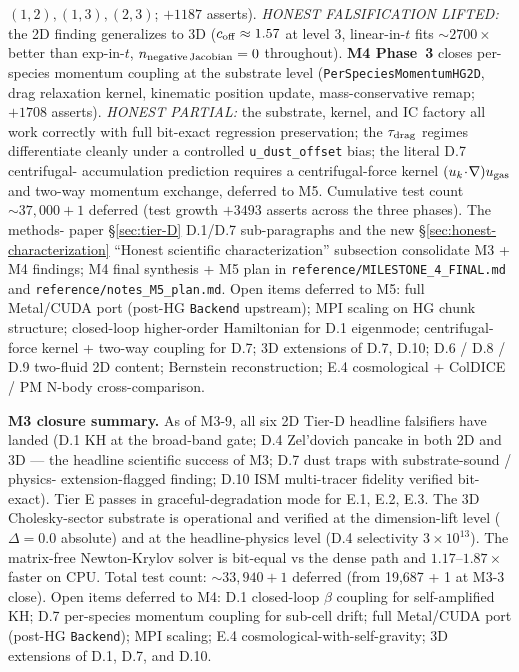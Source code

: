 \documentclass[11pt]{article}
\begin{document}
\begin{description}
$(1,2), (1,3), (2,3)$; $+1187$ asserts). \emph{HONEST FALSIFICATION
LIFTED:} the 2D finding generalizes to 3D ($c_{\rm off} \approx 1.57$
at level $3$, linear-in-$t$ fits $\sim 2700\times$ better than
exp-in-$t$, $n_{\rm negative\,Jacobian} = 0$ throughout). \textbf{M4
Phase~3} closes per-species momentum coupling at the substrate level
(\texttt{PerSpeciesMomentumHG2D}, drag relaxation kernel, kinematic
position update, mass-conservative remap; $+1708$ asserts).
\emph{HONEST PARTIAL:} the substrate, kernel, and IC factory all
work correctly with full bit-exact regression preservation; the
$\tau_{\rm drag}$ regimes differentiate cleanly under a controlled
\texttt{u\_dust\_offset} bias; the literal D.7 centrifugal-
accumulation prediction requires a centrifugal-force kernel
$(u_k\!\cdot\!\nabla)u_{\rm gas}$ and two-way momentum exchange,
deferred to M5. Cumulative test count $\sim 37{,}000 + 1$ deferred
(test growth $+3493$ asserts across the three phases). The methods-
paper §\ref{sec:tier-D} D.1/D.7 sub-paragraphs and the new
\S\ref{sec:honest-characterization} ``Honest scientific
characterization'' subsection consolidate M3 + M4 findings; M4 final
synthesis + M5 plan in \verb|reference/MILESTONE_4_FINAL.md| and
\verb|reference/notes_M5_plan.md|. Open items deferred to M5: full
Metal/CUDA port (post-HG \texttt{Backend} upstream); MPI scaling on
HG chunk structure; closed-loop higher-order Hamiltonian for D.1
eigenmode; centrifugal-force kernel + two-way coupling for D.7;
3D extensions of D.7, D.10; D.6 / D.8 / D.9 two-fluid 2D content;
Bernstein reconstruction; E.4 cosmological + ColDICE / PM N-body
cross-comparison.
\end{description}

\textbf{M3 closure summary.} As of M3-9, all six 2D Tier-D headline
falsifiers have landed (D.1 KH at the broad-band gate; D.4
Zel'dovich pancake in both 2D and 3D --- the headline scientific
success of M3; D.7 dust traps with substrate-sound / physics-
extension-flagged finding; D.10 ISM multi-tracer fidelity verified
bit-exact). Tier E passes in graceful-degradation mode for E.1, E.2,
E.3. The 3D Cholesky-sector substrate is operational and verified at
the dimension-lift level ($\Delta = 0.0$ absolute) and at the
headline-physics level (D.4 selectivity $3\times 10^{13}$). The
matrix-free Newton-Krylov solver is bit-equal vs the dense path and
$1.17$--$1.87\times$ faster on CPU. Total test count: $\sim 33{,}940
+ 1$ deferred (from 19{,}687 + 1 at M3-3 close). Open items
deferred to M4: D.1 closed-loop $\beta$ coupling for self-amplified
KH; D.7 per-species momentum coupling for sub-cell drift; full
Metal/CUDA port (post-HG \texttt{Backend}); MPI scaling; E.4
cosmological-with-self-gravity; 3D extensions of D.1, D.7, and D.10.
\end{document}
